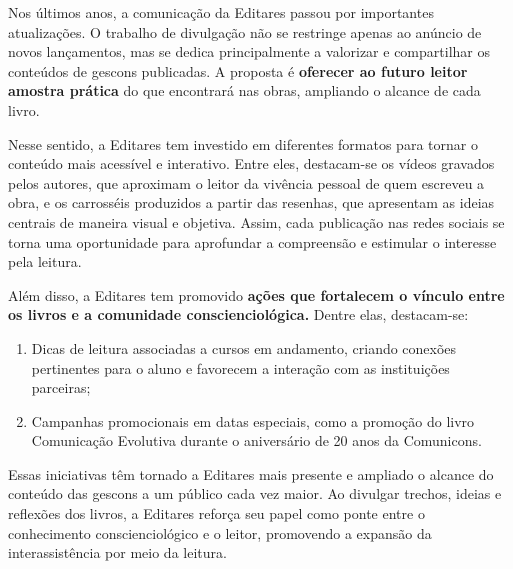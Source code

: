 \documentclass{gescons}
\begin{document}
    \begin{multicols}{2}


Nos últimos anos, a comunicação da Editares passou por importantes atualizações. O trabalho de divulgação não se restringe apenas ao anúncio de novos lançamentos, mas se dedica principalmente a valorizar e compartilhar os conteúdos de gescons publicadas. A proposta é \textbf{oferecer ao futuro leitor amostra prática} do que encontrará nas obras, ampliando o alcance de cada livro.

Nesse sentido, a Editares tem investido em diferentes formatos para tornar o conteúdo mais acessível e interativo. Entre eles, destacam-se os vídeos gravados pelos autores, que aproximam o leitor da vivência pessoal de quem escreveu a obra, e os carrosséis produzidos a partir das resenhas, que apresentam as ideias centrais de maneira visual e objetiva. Assim, cada publicação nas redes sociais se torna uma oportunidade para aprofundar a compreensão e estimular o interesse pela leitura.

Além disso, a Editares tem promovido \textbf{ações que fortalecem o vínculo entre os livros e a comunidade conscienciológica.} Dentre elas, destacam-se:

\begin{enumerate}
\def\labelenumi{\arabic{enumi}.}
\item
  Dicas de leitura associadas a cursos em andamento, criando conexões pertinentes para o aluno e favorecem a interação com as instituições parceiras;
\item
  Campanhas promocionais em datas especiais, como a promoção do livro Comunicação Evolutiva durante o aniversário de 20 anos da Comunicons.
\end{enumerate}

Essas iniciativas têm tornado a Editares mais presente e ampliado o alcance do conteúdo das gescons a um público cada vez maior. Ao divulgar trechos, ideias e reflexões dos livros, a Editares reforça seu papel como ponte entre o conhecimento conscienciológico e o leitor, promovendo a expansão da interassistência por meio da leitura.






    \end{multicols}
\end{document}

